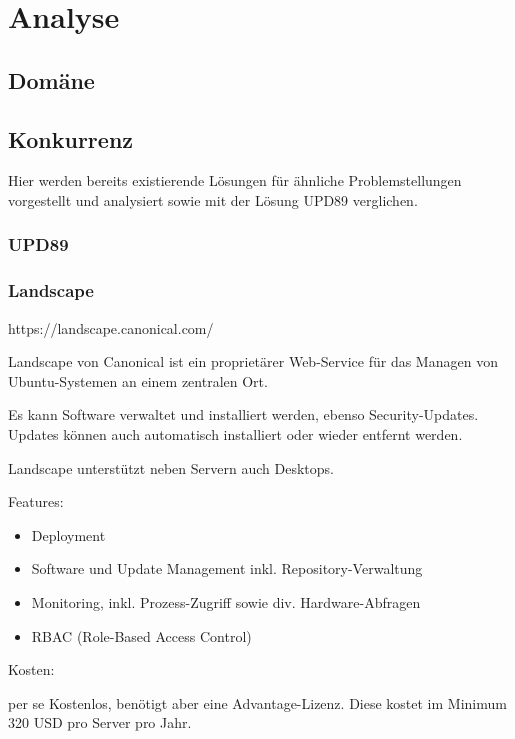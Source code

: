 \chapter{Analyse}

\section{Domäne}

\section{Konkurrenz} \label{sec:analysis:competition}

Hier werden bereits existierende Lösungen für ähnliche Problemstellungen vorgestellt und analysiert sowie mit der Lösung \gls{UPD89} verglichen.

\subsection{UPD89}


\subsection{Landscape}
https://landscape.canonical.com/

Landscape von Canonical ist ein proprietärer Web-Service für das Managen von Ubuntu-Systemen an einem zentralen Ort.

Es kann Software verwaltet und installiert werden, ebenso Security-Updates. Updates können auch automatisch installiert oder wieder entfernt werden.

Landscape unterstützt neben Servern auch Desktops.


Features:

\begin{itemize}
\item Deployment
\item Software und Update Management inkl. Repository-Verwaltung
\item Monitoring, inkl. Prozess-Zugriff sowie div. Hardware-Abfragen
\item RBAC (Role-Based Access Control)
\end{itemize}


Kosten:

per se Kostenlos, benötigt aber eine Advantage-Lizenz. Diese kostet im Minimum 320 USD pro Server pro Jahr.


